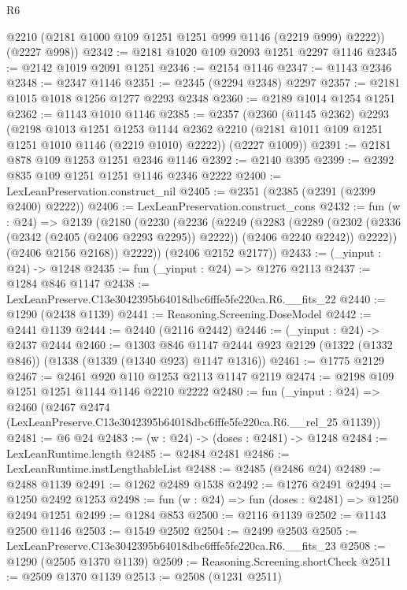 \begin{lexlean}{R6}
\begin{coremodule}
        @2210
        (@2181 @1000 @109 @1251 @1251 @999 @1146 (@2219 @999) @2222))
      (@2227 @998))
@2342 := @2181 @1020 @109 @2093 @1251 @2297 @1146
@2345 := @2142 @1019 @2091 @1251
@2346 := @2154 @1146
@2347 := @1143 @2346
@2348 := @2347 @1146
@2351 := @2345 (@2294 @2348) @2297
@2357 := @2181 @1015 @1018 @1256 @1277 @2293 @2348
@2360 := @2189 @1014 @1254 @1251
@2362 := @1143 @1010 @1146
@2385 := @2357
    (@2360
      (@1145 @2362)
      @2293
      (@2198
        @1013
        @1251
        @1253
        @1144
        @2362
        @2210
        (@2181 @1011 @109 @1251 @1251 @1010 @1146 (@2219 @1010) @2222))
      (@2227 @1009))
@2391 := @2181 @878 @109 @1253 @1251 @2346 @1146
@2392 := @2140 @395
@2399 := @2392 @835 @109 @1251 @1251 @1146 @2346 @2222
@2400 := LexLeanPreservation.construct_nil
@2405 := @2351 (@2385 (@2391 (@2399 @2400) @2222))
@2406 := LexLeanPreservation.construct_cons
@2432 := fun (w : @24) =>
  @2139
    (@2180
      (@2230
        (@2236
          (@2249
            (@2283
              (@2289
                (@2302 (@2336 (@2342 (@2405 (@2406 @2293 @2295)) @2222)) (@2406 @2240 @2242))
                @2222))
            (@2406 @2156 @2168))
          @2222))
      (@2406 @2152 @2177))
@2433 := (_yinput : @24) -> @1248
@2435 := fun (_yinput : @24) => @1276 @2113
@2437 := @1284 @846 @1147
@2438 := LexLeanPreserve.C13e3042395b64018dbc6fffe5fe220ca.R6.__fits_22
@2440 := @1290 (@2438 @1139)
@2441 := Reasoning.Screening.DoseModel
@2442 := @2441 @1139
@2444 := @2440 (@2116 @2442)
@2446 := (_yinput : @24) -> @2437 @2444
@2460 := @1303
    @846
    @1147
    @2444
    @923
    @2129
    (@1322 (@1332 @846))
    (@1338 (@1339 (@1340 @923) @1147 @1316))
@2461 := @1775 @2129
@2467 := @2461 @920 @110 @1253 @2113 @1147 @2119
@2474 := @2198 @109 @1251 @1251 @1144 @1146 @2210 @2222
@2480 := fun (_yinput : @24) =>
  @2460 (@2467 @2474 (LexLeanPreserve.C13e3042395b64018dbc6fffe5fe220ca.R6.__rel_25 @1139))
@2481 := @6 @24
@2483 := (w : @24) -> (doses : @2481) -> @1248
@2484 := LexLeanRuntime.length
@2485 := @2484 @2481
@2486 := LexLeanRuntime.instLengthableList
@2488 := @2485 (@2486 @24)
@2489 := @2488 @1139
@2491 := @1262 @2489 @1538
@2492 := @1276 @2491
@2494 := @1250 @2492 @1253
@2498 := fun (w : @24) => fun (doses : @2481) => @1250 @2494 @1251
@2499 := @1284 @853
@2500 := @2116 @1139
@2502 := @1143 @2500 @1146
@2503 := @1549 @2502
@2504 := @2499 @2503
@2505 := LexLeanPreserve.C13e3042395b64018dbc6fffe5fe220ca.R6.__fits_23
@2508 := @1290 (@2505 @1370 @1139)
@2509 := Reasoning.Screening.shortCheck
@2511 := @2509 @1370 @1139
@2513 := @2508 (@1231 @2511)

\end{coremodule}
\end{lexlean}
